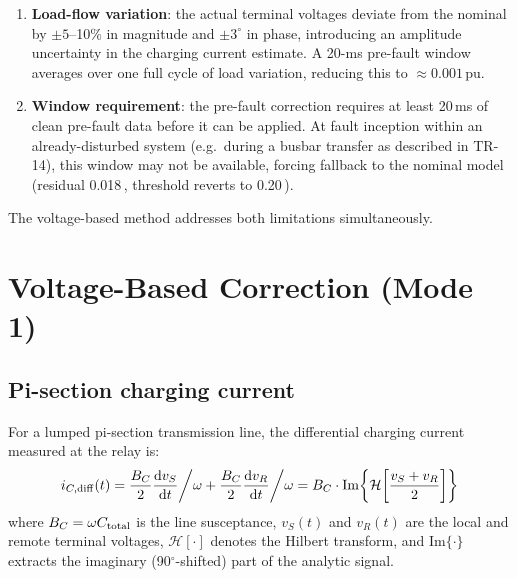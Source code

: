 \documentclass[11pt,a4paper]{article}
\newcommand{\BC}{B_C}
\newcommand{\pu}{\,\text{pu}}
\begin{document}
\begin{enumerate}
  \item \textbf{Load-flow variation}: the actual terminal voltages deviate
        from the nominal by $\pm5$--10\% in magnitude and $\pm3^\circ$ in
        phase, introducing an amplitude uncertainty in the charging current
        estimate.  A 20-ms pre-fault window averages over one full cycle of
        load variation, reducing this to $\approx 0.001\pu$.

  \item \textbf{Window requirement}: the pre-fault correction requires at
        least 20\,ms of clean pre-fault data before it can be applied.  At
        fault inception within an already-disturbed system (e.g.\ during a
        busbar transfer as described in TR-14), this window may not be
        available, forcing fallback to the nominal model (residual
        0.018\pu, threshold reverts to 0.20\pu).
\end{enumerate}

The voltage-based method addresses both limitations simultaneously.

\section{Voltage-Based Correction (Mode 1)}
\label{sec:mode1}

\subsection{Pi-section charging current}

For a lumped pi-section transmission line, the differential charging current
measured at the relay is:
\begin{equation}
  i_{C,\rm diff}(t)
  = \frac{\BC}{2} \frac{\mathrm{d}v_S}{\mathrm{d}t}\bigg/\omega
  + \frac{\BC}{2} \frac{\mathrm{d}v_R}{\mathrm{d}t}\bigg/\omega
  = \BC \cdot \mathrm{Im}\!\left\{\mathcal{H}\!\left[\frac{v_S + v_R}{2}\right]\right\}
  \label{eq:ic_hilbert}
\end{equation}
where $\BC = \omega C_{\rm total}$ is the line susceptance, $v_S(t)$ and
$v_R(t)$ are the local and remote terminal voltages, $\mathcal{H}[\cdot]$
denotes the Hilbert transform, and $\mathrm{Im}\{\cdot\}$ extracts the
imaginary (90$^\circ$-shifted) part of the analytic signal.
\end{document}
